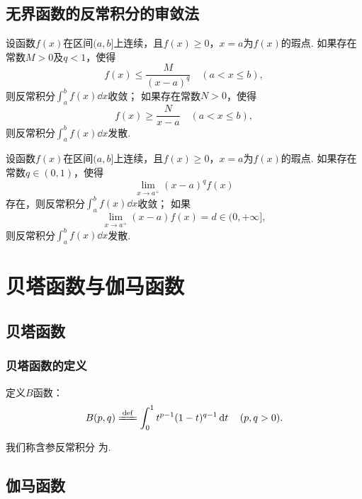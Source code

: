 \subsection{无界函数的反常积分的审敛法}
\begin{theorem}[比较审敛法]\label{theorem:定积分.无界函数的反常积分的比较审敛法}
设函数\(f(x)\)在区间\((a,b]\)上连续，且\(f(x) \geq 0\)，\(x=a\)为\(f(x)\)的瑕点.
如果存在常数\(M > 0\)及\(q < 1\)，使得\[
f(x) \leq \frac{M}{(x-a)^q} \quad (a < x \leq b),
\]则反常积分\(\int_a^b f(x) \dd{x}\)收敛；
如果存在常数\(N > 0\)，使得\[
f(x) \geq \frac{N}{x - a} \quad (a < x \leq b),
\]则反常积分\(\int_a^b f(x) \dd{x}\)发散.
\end{theorem}

\begin{theorem}[极限审敛法]\label{theorem:定积分.无界函数的反常积分的极限审敛法}
设函数\(f(x)\)在区间\((a,b]\)上连续，且\(f(x) \geq 0\)，\(x=a\)为\(f(x)\)的瑕点.
如果存在常数\(q \in (0,1)\)，使得\[
\lim\limits_{x \to a^+} (x-a)^q f(x)
\]存在，则反常积分\(\int_a^b f(x) \dd{x}\)收敛；
如果\[
\lim\limits_{x \to a^+} (x-a) f(x) = d \in (0,+\infty],
\]则反常积分\(\int_a^b f(x) \dd{x}\)发散.
\end{theorem}

\section{贝塔函数与伽马函数}
\subsection{贝塔函数}
\subsubsection{贝塔函数的定义}
\begin{definition}
定义\(B\)函数：
\begin{equation}\label{equation:特殊函数.贝塔函数的定义式}
B(p,q)
\defeq
\int_0^1 t^{p-1} (1-t)^{q-1} \dd{t}
\quad(p,q>0).
\end{equation}
\end{definition}
我们称含参反常积分  为.

\subsection{伽马函数}
